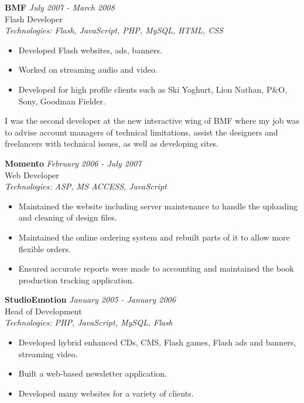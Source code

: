 \documentclass[a4paper,10pt]{article}
\begin{document}
\vspace{1em}

\textbf{BMF} \hfill \textit{July 2007 - March 2008} \\
Flash Developer \\
\textit{Technologies: Flash, JavaScript, PHP, MySQL, HTML, CSS}
\begin{itemize}
    \item Developed Flash websites, ads, banners.
    \item Worked on streaming audio and video.
    \item Developed for high profile clients such as Ski Yoghurt, Lion Nathan, P\&O, Sony, Goodman Fielder.
\end{itemize}

I was the second developer at the new interactive wing of BMF where my job was to advise account managers of technical limitations, assist the designers and freelancers with technical issues, as well as developing sites.

\vspace{1em}

\textbf{Momento} \hfill \textit{February 2006 - July 2007} \\
Web Developer \\
\textit{Technologies: ASP, MS ACCESS, JavaScript}
\begin{itemize}
    \item Maintained the website including server maintenance to handle the uploading and cleaning of design files.
    \item Maintained the online ordering system and rebuilt parts of it to allow more flexible orders.
    \item Ensured accurate reports were made to accounting and maintained the book production tracking application.
\end{itemize}

\vspace{1em}

\textbf{StudioEmotion} \hfill \textit{January 2005 - January 2006} \\
Head of Development \\
\textit{Technologies: PHP, JavaScript, MySQL, Flash}
\begin{itemize}
    \item Developed hybrid enhanced CDs, CMS, Flash games, Flash ads and banners, streaming video.
    \item Built a web-based newsletter application.
    \item Developed many websites for a variety of clients.
\end{itemize}
\end{document}
